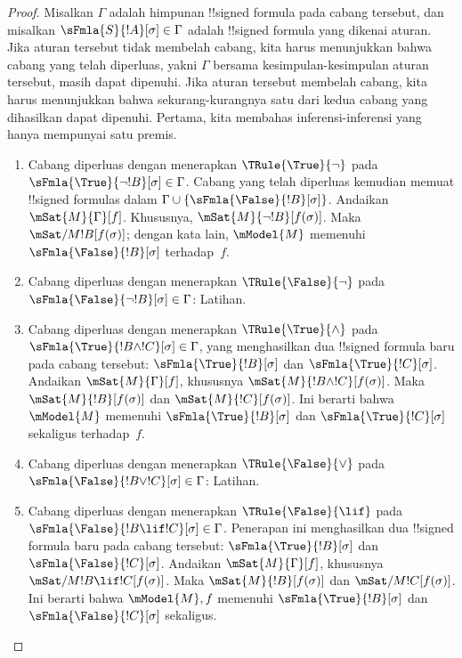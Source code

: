 \documentclass[../../../include/open-logic-section]{subfiles}
\begin{document}
\begin{proof}
Misalkan $\Gamma$ adalah himpunan !!{signed formula} pada cabang tersebut,
dan misalkan $\sFmla{S}{!A}[\sigma] \in \Gamma$ adalah !!{signed formula}
yang dikenai aturan. Jika aturan tersebut tidak membelah cabang, kita harus
menunjukkan bahwa cabang yang telah diperluas, yakni $\Gamma$ bersama
kesimpulan-kesimpulan aturan tersebut, masih dapat dipenuhi. Jika aturan
tersebut membelah cabang, kita harus menunjukkan bahwa sekurang-kurangnya
satu dari kedua cabang yang dihasilkan dapat dipenuhi.
Pertama, kita membahas inferensi-inferensi yang hanya mempunyai satu premis.
\begin{enumerate}
\item Cabang diperluas dengan menerapkan $\TRule{\True}{\lnot}$ pada
  $\sFmla{\True}{\lnot !B}[\sigma] \in \Gamma$. Cabang yang telah
  diperluas kemudian memuat !!{signed formula}s dalam $\Gamma \cup
  \{\sFmla{\False}{!B}[\sigma]\}$. Andaikan $\mSat{M}{\Gamma}[f]$.
  Khususnya, $\mSat{M}{\lnot !B}[f(\sigma)]$. Maka
  $\mSat/{M}{!B}[f(\sigma)]$; dengan kata lain, $\mModel{M}$ memenuhi
  $\sFmla{\False}{!B}[\sigma]$ terhadap~$f$.
\item Cabang diperluas dengan menerapkan $\TRule{\False}{\lnot}$ pada
  $\sFmla{\False}{\lnot !B}[\sigma] \in \Gamma$: Latihan.
\item Cabang diperluas dengan menerapkan $\TRule{\True}{\land}$ pada
  $\sFmla{\True}{!B \land !C}[\sigma] \in \Gamma$, yang menghasilkan dua
  !!{signed formula} baru pada cabang tersebut:
  $\sFmla{\True}{!B}[\sigma]$ dan $\sFmla{\True}{!C}[\sigma]$. Andaikan
  $\mSat{M}{\Gamma}[f]$, khususnya
  $\mSat{M}{!B \land !C}[f(\sigma)]$. Maka
  $\mSat{M}{!B}[f(\sigma)]$ dan $\mSat{M}{!C}[f(\sigma)]$. Ini berarti
  bahwa $\mModel{M}$ memenuhi $\sFmla{\True}{!B}[\sigma]$ dan
  $\sFmla{\True}{!C}[\sigma]$ sekaligus terhadap~$f$.
\item Cabang diperluas dengan menerapkan $\TRule{\False}{\lor}$ pada
  $\sFmla{\False}{!B \lor !C}[\sigma] \in \Gamma$: Latihan.
\item Cabang diperluas dengan menerapkan $\TRule{\False}{\lif}$ pada
  $\sFmla{\False}{!B \lif !C}[\sigma] \in \Gamma$. Penerapan ini
  menghasilkan dua !!{signed formula} baru pada cabang tersebut:
  $\sFmla{\True}{!B}[\sigma]$ dan $\sFmla{\False}{!C}[\sigma]$. Andaikan
  $\mSat{M}{\Gamma}[f]$, khususnya
  $\mSat/{M}{!B \lif !C}[f(\sigma)]$. Maka
  $\mSat{M}{!B}[f(\sigma)]$ dan $\mSat/{M}{!C}[f(\sigma)]$. Ini berarti
  bahwa $\mModel{M}, f$ memenuhi $\sFmla{\True}{!B}[\sigma]$ dan
  $\sFmla{\False}{!C}[\sigma]$ sekaligus.


\end{enumerate}
\end{proof}
\end{document}
